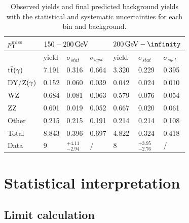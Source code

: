 \begin{table}[tbp]
 \centering
 \caption{Observed yields and final predicted background yields with the statistical and systematic uncertainties for each bin and background.}
 \normalsize
 \label{tab:results}
 \begin{tabular}{lllllll}
  $p_{\mathrm{T}}^\text{miss}$      & \multicolumn{3}{l}{$150-200\,\text{Ge\hspace{-.08em}V}$} & \multicolumn{3}{l}{$200\GeV-\infinity$}                                                                  \\\hline
                 & yield                             & $\sigma_{stat}$                         & $\sigma_{syst}$ & yield & $\sigma_{stat}$    & $\sigma_{syst}$ \\\hline
  ${\mathrm{t}\overline{\mathrm{t}}}(\gamma)$ & 7.191                             & 0.316                                   & 0.664           & 3.320 & 0.229              & 0.395           \\
  DY/$\mathrm{Z}(\gamma)$ & 0.152                             & 0.060                                   & 0.039           & 0.042 & 0.024              & 0.010           \\
  $\mathrm{W}\mathrm{Z}$       & 0.684                             & 0.081                                   & 0.063           & 0.579 & 0.076              & 0.054           \\
  $\mathrm{Z}\mathrm{Z}$       & 0.601                             & 0.019                                   & 0.052           & 0.667 & 0.020              & 0.061           \\
  Other          & 0.215                             & 0.215                                   & 0.191           & 0.214 & 0.214              & 0.108           \\\hline
  Total          & 8.843                             & 0.396                                   & 0.697           & 4.822 & 0.324              & 0.418           \\\hline
  Data           & 9                                 & $^{+4.11}_{-2.94}$                      & /               & 8     & $^{+3.95}_{-2.76}$ & /               \\\hline
 \end{tabular}
\end{table}


\section{Statistical interpretation}

\subsection{Limit calculation}

